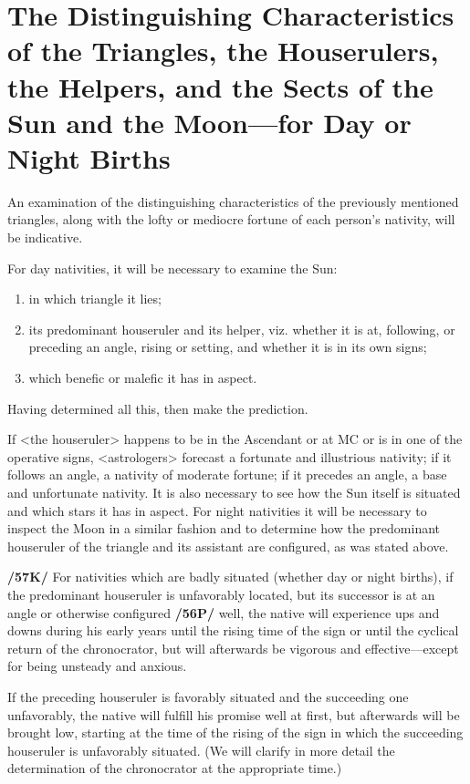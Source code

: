 \section{The Distinguishing Characteristics of the Triangles, the Houserulers, the Helpers, and the Sects of the Sun and the Moon—for Day or Night Births}
An examination of the distinguishing characteristics of the previously mentioned triangles, along with the lofty or mediocre fortune of each person’s nativity, will be indicative. 

\mnm[0.3cm]
For day nativities, it will be necessary to examine the Sun: 
\begin{enumerate}
\item in which triangle it lies;
\item its predominant houseruler and its helper, viz. whether it is at, following, or preceding an angle, rising or setting, and whether it is in its own signs;
\item which benefic or malefic it has in aspect. 
\end{enumerate}
Having determined all this, then make the prediction. 

\mndl[0.2cm]
If <the houseruler> happens to be in the Ascendant or at MC or is in one of the operative signs, <astrologers> forecast a fortunate and illustrious nativity; if it follows an angle, a nativity of moderate fortune; if it precedes an angle, a base and unfortunate nativity. It is also necessary to see how the Sun itself is situated and which stars it has in aspect. For night nativities it will be necessary to inspect the Moon in a similar fashion and to determine how the predominant houseruler of the triangle and its assistant are configured, as was stated above.

\textbf{/57K/} For nativities which are badly situated (whether day or night births), if the predominant
houseruler is unfavorably located, but its successor is at an angle or otherwise configured \textbf{/56P/} well, the
native will experience ups and downs during his early years until the rising time of the sign or until the cyclical return of the chronocrator, but will afterwards be vigorous and effective—except for being unsteady and anxious. 

If the preceding houseruler is favorably situated and the succeeding one unfavorably, the native will fulfill his promise well at first, but afterwards will be brought low, starting at the time of the rising of the sign in which the succeeding houseruler is unfavorably situated. (We will clarify in more detail the determination of the chronocrator at the appropriate time.) 

